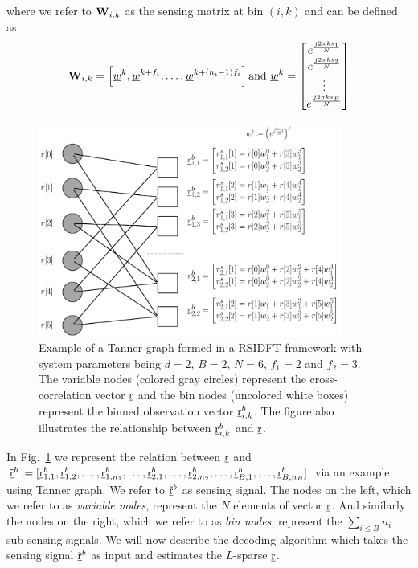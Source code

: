\begin{enumerate}
where we refer to $\mathbf{W}_{i,k}$ as the sensing matrix at bin $(i,k)$ and can be defined as  
\begin{align}\label{Eqn:Sensing Matrix}
	\mathbf{W}_{i,k} = \left[\underline{w}^{k},\underline{w}^{k+f_i},\ldots, \underline{w}^{k+(n_i-1)f_i}\right] \text{and} ~\underline{w}^{k}=
	\begin{bmatrix}
		e^{\frac{j2\pi ks_1}{N}}\\
		e^{\frac{j2\pi ks_2}{N}}\\
		\vdots\\
		e^{\frac{j2\pi ks_B}{N}}
	\end{bmatrix}
\end{align}

\begin{figure}[h!]
	\begin{center}
		\includegraphics[height=7cm]{Figures/Factorgraph} 
	\end{center}	   
	\caption{Example of a Tanner graph formed in a RSIDFT framework with system parameters being $d=2$, $B=2$, $N=6$, $f_1 = 2$ and $f_2=3$. The variable nodes (colored gray circles) represent the cross-correlation vector $\underline{\mathrm{r}}$ and the bin nodes (uncolored white boxes) represent the binned observation vector $\underline{\mathrm{r}}_{i,k}^b$. The figure also illustrates the relationship between $\underline{\mathrm{r}}_{i,k}^b$ and $\underline{\mathrm{r}}$.}\label{fig:factorgraph}
	\vspace{5 pt}
\end{figure}

In Fig.~\ref{fig:factorgraph} we represent the relation between $\underline{\mathrm{r}}$ and $\tilde{\underline{\mathrm{r}}}^{b}\mathrel{\mathop:}=[\underline{\mathrm{r}}^{b}_{1,1},\underline{\mathrm{r}}^{b}_{1,2},\ldots,\underline{\mathrm{r}}^{b}_{1,n_1},\ldots, \underline{\mathrm{r}}^{b}_{2,1},\ldots,\underline{\mathrm{r}}^{b}_{2,n_2},\ldots, \underline{\mathrm{r}}^{b}_{B,1},\ldots,\underline{\mathrm{r}}^{b}_{B,n_B}]$
via an example using Tanner graph. We refer to $\tilde{\underline{\mathrm{r}}}^{b}$ as sensing signal. The nodes on the left, which we refer to as {\it variable nodes}, represent the $N$ elements of vector $\underline{\mathrm{r}}$. And similarly the nodes on the right, which we refer to as {\it bin nodes}, represent the $\sum_{i\leq B} n_i$ sub-sensing signals. We will now describe the decoding algorithm which takes the sensing signal $\tilde{\underline{\mathrm{r}}}^b$ as input and estimates the $L$-sparse $\underline{\mathrm{r}}$.	 


\end{enumerate}
